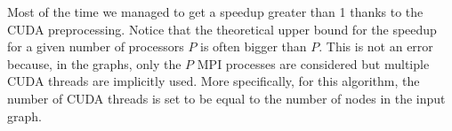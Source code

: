 Most of the time we managed to get a speedup greater than 1 thanks to the CUDA preprocessing. Notice that the theoretical upper bound for the speedup for a given number of processors $P$ is often bigger than $P$. This is not an error because, in the graphs, only the $P$ MPI processes are considered but multiple CUDA threads are implicitly used. More specifically, for this algorithm, the number of CUDA threads is set to be equal to the number of nodes in the input graph.